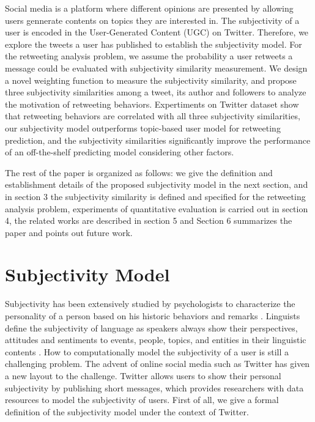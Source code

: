 \documentclass[letterpaper]{article}
\begin{document}
Social media is a platform where different opinions are presented by allowing users gennerate contents on topics they are interested in. 
The subjectivity of a user is encoded in the User-Generated Content (UGC) on Twitter. 
Therefore, we explore the tweets a user has published to establish the subjectivity model. 
For the retweeting analysis problem, we assume the probability a user retweets a message could be evaluated with subjectivity similarity measurement. 
We design a novel weighting function to measure the subjectivity similarity, and propose three subjectivity similarities among a tweet, its author and followers to analyze the motivation of retweeting behaviors. 
Expertiments on Twitter dataset show that retweeting behaviors are correlated with all three subjectivity similarities, our subjectivity model outperforms topic-based user model for retweeting prediction, and the subjectivity similarities significantly improve the performance of an off-the-shelf predicting model considering other factors. 

The rest of the paper is organized as follows: we give the definition and establishment details of the proposed subjectivity model in the next section, and in section 3 the subjectivity similarity is defined and specified for the retweeting analysis problem, experiments of quantitative evaluation is carried out in section 4, the related works are described in section 5 and Section 6 summarizes the paper and points out future work.

\section{Subjectivity Model}
\label{subjectivemodel}

Subjectivity has been extensively studied by psychologists to characterize the personality of a person based on his historic behaviors and remarks \cite{engbert2007agency}. 
Linguists define the subjectivity of language as speakers always show their perspectives, attitudes and sentiments to events, people, topics, and entities in their linguistic contents \cite{stein2005subjectivity}. 
How to computationally model the subjectivity of a user is still a challenging problem. 
The advent of online social media such as Twitter has given a new layout to the challenge.  
Twitter allows users to show their personal subjectivity by publishing short messages, which provides researchers with data resources to model the subjectivity of users.
First of all, we give a formal definition of the subjectivity model under the context of Twitter.
\end{document}

